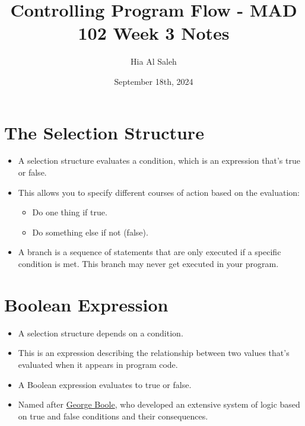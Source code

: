\documentclass{article}
\title{Controlling Program Flow - MAD 102 Week 3 Notes}
\author{Hia Al Saleh}
\date{September 18th, 2024}
\begin{document}
\maketitle
\tableofcontents 
\newpage

\section{The Selection Structure}
\begin{itemize}
    \item A selection structure evaluates a condition, which is an expression that’s true or false.
    \item This allows you to specify different courses of action based on the evaluation:
    \begin{itemize}
        \item Do one thing if true.
        \item Do something else if not (false).
    \end{itemize}
    \item A branch is a sequence of statements that are only executed if a specific condition is met. This branch may never get executed in your program.
\end{itemize}

\section{Boolean Expression}
\begin{itemize}
    \item A selection structure depends on a condition.
    \item This is an expression describing the relationship between two values that’s evaluated when it appears in program code.
    \item A Boolean expression evaluates to true or false.
    \item Named after \href{https://en.wikipedia.org/wiki/George_Boole}{George Boole}, who developed an extensive system of logic based on true and false conditions and their consequences.
\end{itemize}
\end{document}
